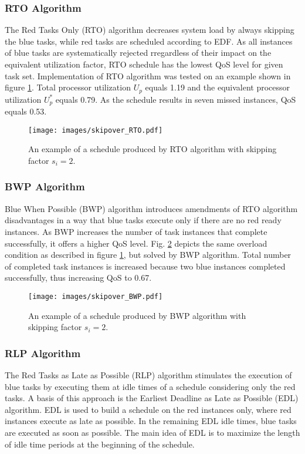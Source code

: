 \subsubsection{RTO Algorithm}
The Red Tasks Only (RTO) algorithm decreases system load by always skipping the blue tasks, while red tasks are scheduled according to EDF. 
As all instances of blue tasks are systematically rejected rregardless of their impact on the equivalent utilization factor, RTO schedule has the lowest QoS level for given task set.
Implementation of RTO algorithm was tested on an example shown in 
figure \ref{rto}.
Total processor utilization $U_p$ equals 1.19 and the equivalent processor 
utilization $U_p^\ast$ equals 0.79.
As the schedule results in seven missed instances, QoS equals 0.53. 
\\
\begin{figure}[ht]
    \centering
    \texttt{[image: images/skipover\_RTO.pdf]}
    \caption{An example of a schedule produced by RTO algorithm with skipping factor $s_i=2$.}
    \label{rto}
\end{figure}

\subsubsection{BWP Algorithm}
Blue When Possible (BWP) algorithm introduces amendments of RTO algorithm disadvantages in a way that blue tasks execute only if there are no red ready instances.
As BWP increases the number of task instances that complete successfully, it offers a higher QoS level. 
Fig. \ref{bwp} depicts the same overload condition as described in figure 
\ref{rto}, but solved by BWP algorithm. 
Total number of completed task instances is increased because two blue instances completed successfully, thus increasing QoS to 0.67.
\\
\begin{figure}[ht]
    \centering
    \texttt{[image: images/skipover\_BWP.pdf]}
    \caption{An example of a schedule produced by BWP algorithm with skipping factor $s_i=2$.}
    \label{bwp}
\end{figure}

\subsubsection{RLP Algorithm}
The Red Tasks as Late as Possible (RLP) algorithm stimulates the execution of blue tasks by executing them at idle times of a schedule considering only the red tasks. 
A basis of this approach is the Earliest Deadline as Late as Possible (EDL) algorithm. 
EDL is used to build a schedule on the red instances only, where red instances execute as late as possible. 
In the remaining EDL idle times, blue tasks are executed as soon as possible. 
The main idea of EDL is to maximize the length of idle time periods at the beginning of the schedule. 

